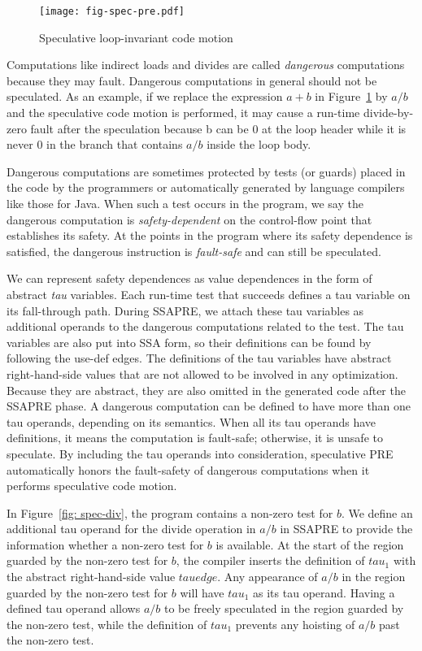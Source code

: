 \begin{figure}
\centering
\texttt{[image: fig-spec-pre.pdf]}
\caption{Speculative loop-invariant code motion}
\label{fig: spec-pre}
\end{figure}

Computations like indirect loads and divides are called \emph{dangerous}
computations because they may fault.  Dangerous computations in general should
not be speculated.
As an example, if we replace the expression $a+b$ in Figure~\ref{fig: spec-pre}
by $a/b$ and the speculative code motion is performed, it may cause a run-time
divide-by-zero fault after the speculation because b can be $0$ at the 
loop header while it is never $0$ in the branch that contains $a/b$ inside the 
loop body.

Dangerous computations are sometimes protected by tests (or guards) placed in
the code by the programmers or automatically generated by language compilers
like those for Java.  When such a test occurs in the
program, we say the dangerous computation is \emph{safety-dependent} on
the control-flow point that establishes its safety.  At the points in the 
program where its safety dependence is satisfied, the dangerous instruction
is \emph{fault-safe} and can still be speculated.

We can represent safety dependences as value dependences in the
form of abstract \emph{tau} variables.  Each run-time test
that succeeds defines a tau variable on its fall-through path.  During SSAPRE,
we attach these tau variables as additional operands to the
dangerous computations related to the test.  The tau variables are also 
put into SSA form, so their definitions can
be found by following the use-def edges.  The definitions of the tau variables 
have abstract right-hand-side values that are not allowed to be
involved in any optimization.  Because they are abstract, they
are also omitted in the generated code after the SSAPRE phase.  A dangerous
computation can be defined to have more than one tau operands, depending on
its semantics.  When all its tau operands have definitions, 
it means the computation is fault-safe; otherwise, it is unsafe to speculate.  
By including the tau operands into consideration, speculative PRE automatically
honors the fault-safety of dangerous computations when it performs speculative
code motion.

In Figure~\ref{fig: spec-div}, the program contains a 
non-zero test for $b$.  We define an additional tau operand
for the divide operation in $a/b$ in SSAPRE to
provide the information whether a non-zero test for $b$ is available.  
At the start of the region guarded by the non-zero test for $b$, the compiler
inserts the definition of $tau_1$ with the abstract right-hand-side value 
$tauedge$.  Any appearance of $a/b$ in the region guarded by
the non-zero test for $b$ will have $tau_1$ as its tau operand.  Having a
defined tau operand allows $a/b$ to be freely speculated in the region
guarded by the non-zero test, while the definition of $tau_1$ prevents any
hoisting of $a/b$ past the non-zero test.

